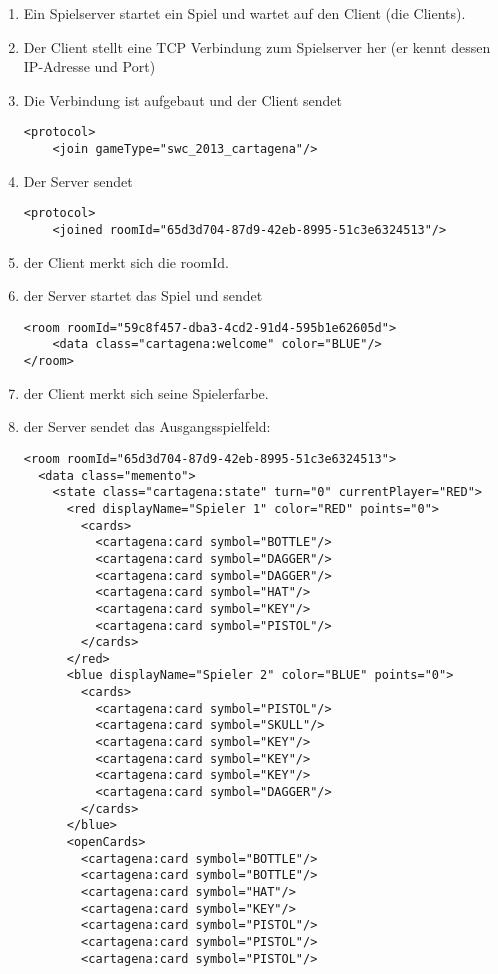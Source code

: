 \documentclass[12pt,a4paper, ngerman, oneside]{scrartcl}
\begin{document}
\begin{enumerate}
\item Ein Spielserver startet ein Spiel und wartet auf den Client (die Clients).
\item Der Client stellt eine TCP Verbindung zum Spielserver her (er kennt dessen IP-Adresse und Port)
\item Die Verbindung ist aufgebaut und der Client sendet \begin{verbatim}
<protocol>
    <join gameType="swc_2013_cartagena"/>
\end{verbatim}
\item Der Server sendet \begin{verbatim}
<protocol>
    <joined roomId="65d3d704-87d9-42eb-8995-51c3e6324513"/>
\end{verbatim}
\item der Client merkt sich die roomId.
\item der Server startet das Spiel und sendet \begin{verbatim}
<room roomId="59c8f457-dba3-4cd2-91d4-595b1e62605d">
    <data class="cartagena:welcome" color="BLUE"/>
</room>
\end{verbatim}
\item der Client merkt sich seine Spielerfarbe.
\item der Server sendet das Ausgangsspielfeld: 
\begin{verbatim}
<room roomId="65d3d704-87d9-42eb-8995-51c3e6324513">
  <data class="memento">
    <state class="cartagena:state" turn="0" currentPlayer="RED">
      <red displayName="Spieler 1" color="RED" points="0">
        <cards>
          <cartagena:card symbol="BOTTLE"/>
          <cartagena:card symbol="DAGGER"/>
          <cartagena:card symbol="DAGGER"/>
          <cartagena:card symbol="HAT"/>
          <cartagena:card symbol="KEY"/>
          <cartagena:card symbol="PISTOL"/>
        </cards>
      </red>
      <blue displayName="Spieler 2" color="BLUE" points="0">
        <cards>
          <cartagena:card symbol="PISTOL"/>
          <cartagena:card symbol="SKULL"/>
          <cartagena:card symbol="KEY"/>
          <cartagena:card symbol="KEY"/>
          <cartagena:card symbol="KEY"/>
          <cartagena:card symbol="DAGGER"/>
        </cards>
      </blue>
      <openCards>
        <cartagena:card symbol="BOTTLE"/>
        <cartagena:card symbol="BOTTLE"/>
        <cartagena:card symbol="HAT"/>
        <cartagena:card symbol="KEY"/>
        <cartagena:card symbol="PISTOL"/>
        <cartagena:card symbol="PISTOL"/>
        <cartagena:card symbol="PISTOL"/>

\end{verbatim}
\end{enumerate}
\end{document}
